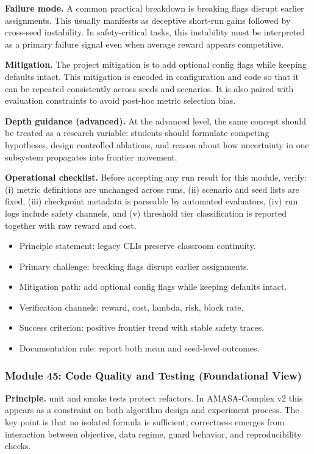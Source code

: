 \documentclass[conference]{IEEEtran}
\begin{document}
\textbf{Failure mode.} A common practical breakdown is breaking flags disrupt earlier assignments. This usually manifests as deceptive short-run gains followed by cross-seed instability. In safety-critical tasks, this instability must be interpreted as a primary failure signal even when average reward appears competitive.

\textbf{Mitigation.} The project mitigation is to add optional config flags while keeping defaults intact. This mitigation is encoded in configuration and code so that it can be repeated consistently across seeds and scenarios. It is also paired with evaluation constraints to avoid post-hoc metric selection bias.

\textbf{Depth guidance (advanced).} At the advanced level, the same concept should be treated as a research variable: students should formulate competing hypotheses, design controlled ablations, and reason about how uncertainty in one subsystem propagates into frontier movement.

\textbf{Operational checklist.} Before accepting any run result for this module, verify: (i) metric definitions are unchanged across runs, (ii) scenario and seed lists are fixed, (iii) checkpoint metadata is parseable by automated evaluators, (iv) run logs include safety channels, and (v) threshold tier classification is reported together with raw reward and cost.

\begin{itemize}[leftmargin=*]
  \item Principle statement: legacy CLIs preserve classroom continuity.
  \item Primary challenge: breaking flags disrupt earlier assignments.
  \item Mitigation path: add optional config flags while keeping defaults intact.
  \item Verification channels: reward, cost, lambda, risk, block rate.
  \item Success criterion: positive frontier trend with stable safety traces.
  \item Documentation rule: report both mean and seed-level outcomes.
\end{itemize}


\subsubsection{Module 45: Code Quality and Testing (Foundational View)}
\textbf{Principle.} unit and smoke tests protect refactors. In AMASA-Complex v2 this appears as a constraint on both algorithm design and experiment process. The key point is that no isolated formula is sufficient; correctness emerges from interaction between objective, data regime, guard behavior, and reproducibility checks.
\end{document}
